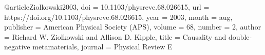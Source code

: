 @article{Ziolkowski2003,
  doi = {10.1103/physreve.68.026615},
  url = {https://doi.org/10.1103/physreve.68.026615},
  year = {2003},
  month = aug,
  publisher = {American Physical Society ({APS})},
  volume = {68},
  number = {2},
  author = {Richard W. Ziolkowski and Allison D. Kipple},
  title = {Causality and double-negative metamaterials},
  journal = {Physical Review E}
}